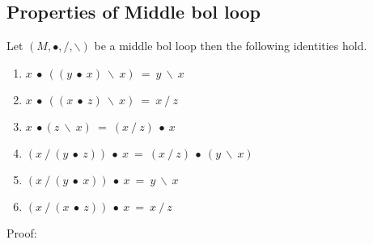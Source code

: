 \subsection{Properties of Middle bol loop}
Let $(M, ∙, /, \backslash)$ be a middle bol loop then the following
identities hold.
\begin{enumerate}
\item \(x\ ∙\ ((y\ ∙\ x)\ \backslash \ x)\ =\ y\ \backslash\ x\) 
\item \(x\ ∙\ ((x\ ∙\ z)\ \backslash \ x)\ =\ x\ /\ z\)
\item \(x\ ∙ (z\ \backslash\ x)\ =\ (x\ /\ z)\ ∙\ x\)
\item \((x\ /\ (y\ ∙\ z))\ ∙\ x\ =\ (x\ /\ z)\ ∙\ (y\ \backslash\ x)\)
\item \((x\ /\ (y\ ∙\ x))\ ∙\ x\ =\ y\ \backslash \ x\)
\item \((x\ /\ (x\ ∙\ z))\ ∙\ x\ = \ x\ /\  z\)
\end{enumerate}
Proof:
